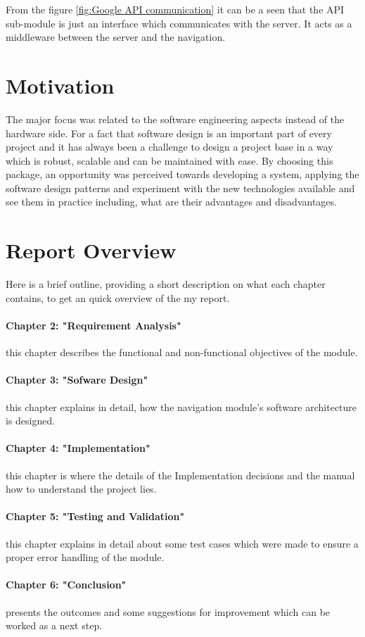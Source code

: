 	\par
		From the figure \ref{fig:Google API communication} it can be a seen that the API sub-module is 
		just an interface which communicates with the server. It acts as a 
		middleware between the server and the navigation.

	\section{Motivation}
		The major focus was related to the software engineering aspects instead of
		the hardware side. For a fact that software design is an important part 
		of every project and
		it has always been a challenge to design a project base
		in a way which is robust, scalable and can be maintained with ease. 
		By choosing this package,
		an opportunity was perceived towards developing a system, 
		applying the software design patterns and experiment with 
		the new	technologies available and see them in practice including, what are 
		their advantages and disadvantages. 

	\section{Report Overview}
		Here is a brief outline, providing a short description on what each chapter contains, to get an
		quick overview of the my report.
		
		\paragraph{Chapter 2: "Requirement Analysis"}
			this chapter describes the functional and non-functional objectives of the module. 
		\paragraph{Chapter 3: "Sofware Design"}
			this chapter explains in detail, how the navigation module's software architecture is designed. 
		\paragraph{Chapter 4: "Implementation"} 
			this chapter is where the details of the Implementation decisions and the manual how to understand 
			the project lies.
		\paragraph{Chapter 5: "Testing and Validation"}
			this chapter explains in detail about some test cases which were made to ensure  
			a proper error handling of the module. 
		\paragraph{Chapter 6: "Conclusion"} 
			presents the outcomes and some suggestions for improvement
			which can be worked as a next step.
